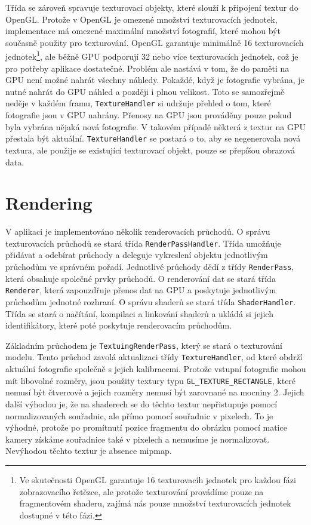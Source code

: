 \documentclass[11pt,twoside,a4paper]{book}
\begin{document}
Třída se zároveň spravuje texturovací objekty, které slouží k připojení textur do OpenGL. Protože v OpenGL je omezené množství texturovacích jednotek, implementace má omezené maximální množství fotografií, které mohou být současně použity pro texturování. OpenGL garantuje minimálně 16 texturovacích jednotek\footnote{Ve skutečnosti OpenGL garantuje 16 texturovacíh jednotek pro každou fázi zobrazovacího řetězce, ale protože texturování provádíme pouze na fragmentovém shaderu, zajímá nás pouze množství texturovacích jednotek dostupné v této fázi.}, ale běžně GPU podporují 32 nebo více texturovacích jednotek, což je pro potřeby aplikace dostatečné. Problém ale nastává v tom, že do paměti na GPU není možné nahrát všechny náhledy. Pokaždé, když je fotografie vybrána, je nutné nahrát do GPU náhled a později i plnou velikost. Toto se samozřejmě neděje v každém framu, \texttt{TextureHandler} si udržuje přehled o tom, které fotografie jsou v GPU nahrány. Přenosy na GPU jsou prováděny pouze pokud byla vybrána nějaká nová fotografie. V takovém případě některá z textur na GPU přestala být aktuální.  \texttt{TextureHandler} se postará o to, aby se negenerovala nová textura, ale použije se existující texturovací objekt, pouze se přepíšou obrazová data. 


\section{Rendering}

V aplikaci je implementováno několik renderovacích průchodů. O správu texturovacích průchodů se stará třída \texttt{RenderPassHandler}. Třída umožňuje přidávat a odebírat průchody a deleguje vykreslení objektu jednotlivým průchodům ve správném pořadí. Jednotlivé průchody dědí z třídy \texttt{RenderPass}, která obsahuje společné prvky průchodů. O renderování dat se stará třída \texttt{Renderer}, která zapouzdřuje přenos dat na GPU a poskytuje jednotlivým průchodům jednotné rozhraní. O správu shaderů se stará třída \texttt{ShaderHandler}. Třída se stará o načítání, kompilaci a linkování shaderů a ukládá si jejich identifikátory, které poté poskytuje renderovacím průchodům.

Základním průchodem je \texttt{TextuingRenderPass}, který se stará o texturování modelu. Tento průchod zavolá aktualizaci třídy \texttt{TextureHandler}, od které obdrží aktuální fotografie společně s jejich kalibracemi. Protože vstupní fotografie mohou mít libovolné rozměry, jsou použity textury typu \verb|GL_TEXTURE_RECTANGLE|, které nemusí být čtvercové a jejich rozměry nemusí být zarovnané na mocniny 2. Jejich další výhodou je, že na shaderech se do těchto textur nepřistupuje pomocí normalizovaných souřadnic, ale přímo pomocí souřadnic v pixelech. To je výhodné, protože po promítnutí pozice fragmentu do obrázku pomocí matice kamery získáme souřadnice také v pixelech a nemusíme je normalizovat. Nevýhodou těchto textur je absence mipmap.
\end{document}

